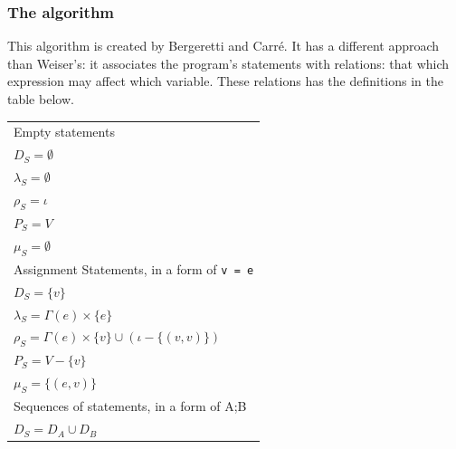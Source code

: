 \documentclass[oneside,12pt,a4paper]{book}
\begin{document}
\subsubsection{The algorithm}
This algorithm is created by Bergeretti and Carré\cite{information-flow}. It has a different approach than Weiser's: it associates the program's statements with relations: that which expression may affect which variable. These relations has the definitions in the table below.
\clearpage
\begin{table}[t]
  \centering
  	\begin{tabular}{l}
Empty statements                                                                            \\
$D_S = \emptyset$                                                                           \\
$\lambda_S = \emptyset$                                                                     \\
$\rho_S = \iota$                                                                            \\
$P_S = V$                                                                                   \\
$\mu_S = \emptyset$                                                                         \\
\hline                                                                                      
Assignment Statements, in a form of \texttt{v = e}                                          \\
$D_S = \{v\}$                                                                               \\
$\lambda_S = \Gamma(e) \times \{e\}$                                                        \\
$\rho_S = \Gamma(e) \times \{v\} \cup (\iota - \{(v,v)\})$                                   \\
$P_S = V - \{v\}$                                                                           \\
$\mu_S = \{(e,v)\}$                                                                         \\
\hline                                                                                      
Sequences of statements, in a form of A;B                                                   \\
$D_S = D_A \cup D_B$                                                                        \\

\end{tabular}
\end{table}
\end{document}
